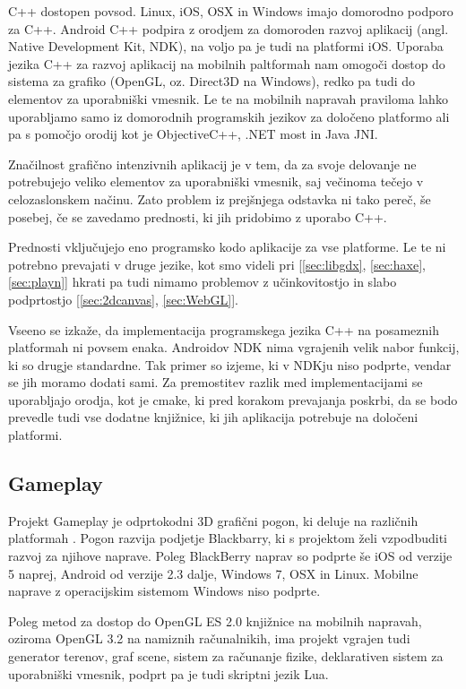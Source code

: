 C++ dostopen povsod. Linux, iOS, OSX in Windows imajo domorodno podporo za C++. Android C++ podpira z orodjem za domoroden razvoj aplikacij (angl. Native Development Kit, NDK), na voljo pa je tudi na platformi iOS. Uporaba jezika C++ za razvoj aplikacij na mobilnih paltformah nam omogoči dostop do sistema za grafiko (OpenGL, oz. Direct3D na Windows), redko pa tudi do elementov za uporabniški vmesnik. Le te na mobilnih napravah praviloma lahko uporabljamo samo iz domorodnih programskih jezikov za določeno platformo ali pa s pomočjo orodij kot je ObjectiveC++, .NET most in Java JNI.

Značilnost grafično intenzivnih aplikacij je v tem, da za svoje delovanje ne potrebujejo veliko elementov za uporabniški vmesnik, saj večinoma tečejo v celozaslonskem načinu. Zato problem iz prejšnjega odstavka ni tako pereč, še posebej, če se zavedamo prednosti, ki jih pridobimo z uporabo C++. 

Prednosti vključujejo eno programsko kodo aplikacije za vse platforme. Le te ni potrebno prevajati v druge jezike, kot smo videli pri [\ref{sec:libgdx}, \ref{sec:haxe}, \ref{sec:playn}] hkrati pa tudi nimamo problemov z učinkovitostjo in slabo podprtostjo [\ref{sec:2dcanvas}, \ref{sec:WebGL}].

Vseeno se izkaže, da implementacija programskega jezika C++ na posameznih platformah ni povsem enaka. Androidov NDK nima vgrajenih velik nabor funkcij, ki so drugje standardne. Tak primer so izjeme, ki v NDKju niso podprte, vendar se jih moramo dodati sami. Za premostitev razlik med implementacijami se uporabljajo orodja, kot je cmake, ki pred korakom prevajanja poskrbi, da se bodo prevedle tudi vse dodatne knjižnice, ki jih aplikacija potrebuje na določeni platformi.

\subsection{Gameplay}

Projekt Gameplay je odprtokodni 3D grafični pogon, ki deluje na različnih platformah \cite{gameplay}. Pogon razvija podjetje Blackbarry, ki s projektom želi vzpodbuditi razvoj za njihove naprave. Poleg BlackBerry naprav so podprte še iOS od verzije 5 naprej, Android od verzije 2.3 dalje, Windows 7, OSX in Linux. Mobilne naprave z operacijskim sistemom Windows niso podprte.

Poleg metod za dostop do OpenGL ES 2.0 knjižnice na mobilnih napravah, oziroma OpenGL 3.2 na namiznih računalnikih, ima projekt vgrajen tudi generator terenov, graf scene, sistem za računanje fizike, deklarativen sistem za uporabniški vmesnik, podprt pa je tudi skriptni jezik Lua.

